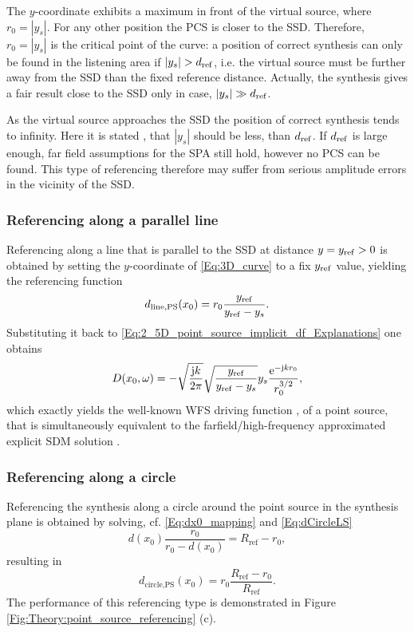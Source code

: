 The $y$-coordinate exhibits a maximum in front of the virtual source, where $r_0 = |y_s|$. For any other position the PCS is closer to the SSD. 
Therefore, $r_0 = |y_s|$ is the critical point of the curve: a position of correct synthesis can only be found in the listening area if $|y_s| > d_{\mathrm{ref}}$, i.e. the virtual source must be further away from the SSD than the fixed reference distance. 
Actually, the synthesis gives a fair result close to the SSD only in case, $|y_s| \gg d_{\mathrm{ref}}$. 


As the virtual source approaches the SSD the position of correct synthesis tends to infinity. Here it is stated , that $|y_s|$ should be less, than $d_{\mathrm{ref}}$. 
If $d_{\mathrm{ref}}$ is large enough, far field assumptions for the SPA still hold, however no PCS can be found. 
This type of referencing therefore may suffer from serious amplitude errors in the vicinity of the SSD.


\subsubsection{Referencing along a parallel line}
Referencing along a line that is parallel to the SSD at distance $y=y_{\mathrm{ref}}>0$ is obtained by setting the $y$-coordinate of \eqref{Eq:3D_curve} to a fix $y_{\mathrm{ref}}$ value, yielding the referencing function
\begin{equation}
d_\text{line,PS}(x_0) = r_0 \frac{y_{\mathrm{ref}}}{y_{\mathrm{ref}}-y_s}.
\end{equation}
Substituting it back to \eqref{Eq:2_5D_point_source_implicit_df_Explanations} one obtains
\begin{equation}
D(x_0,\omega) = 
- \sqrt{\frac{\mathrm{j} k}{2\pi}} \sqrt{\frac{y_{\mathrm{ref}}}{y_{\mathrm{ref}} -y_s}}  y_s \frac{\mathrm{e}^{-\mathrm{j} k r_0 }}{r_0^{3/2}},
\end{equation}
which exactly yields the well-known WFS driving function \cite[(2.27)]{Verheijen1997:phd}, \cite[(3.16)\&(3.17)]{Start1997:phd} of a point source, that is simultaneously equivalent to the farfield/high-frequency approximated explicit SDM solution \cite[(25)]{Spors10ahrens:analysis}.

\subsubsection{Referencing along a circle}
Referencing the synthesis along a circle around the point source in the synthesis plane is obtained by solving, cf. \eqref{Eq:dx0_mapping} and \eqref{Eq:dCircleLS}
\begin{equation}
d(x_0)\frac{r_0}{r_0 - d(x_0)} = R_{\mathrm{ref}} - r_0,
\end{equation}
resulting in
\begin{equation}
d_\text{circle,PS}(x_0)  = r_0 \frac{R_{\mathrm{ref}} - r_0}{R_{\mathrm{ref}}}.
\end{equation}
%
The performance of this referencing type is demonstrated in Figure \ref{Fig:Theory:point_source_referencing} (c).



